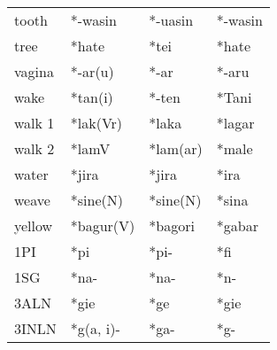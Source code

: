 \begin{table}
\begin{tabular}{llll}
tooth&*-wasin&*-uasin&*-wasin\\
tree&*hate&*tei&*hate\\
vagina&*-ar(u)&*-ar&*-aru\\
wake&*tan(i)&*-ten&*Tani\\
walk 1&*lak(Vr)&*laka&*lagar\\
walk 2&*lamV&*lam(ar)&*male\\
water&*jira&*jira&*ira\\
weave&*sine(N)&*sine(N)&*sina\\
yellow&*bagur(V)&*bagori&*gabar\\
1PI&*pi&*pi-&*fi\\
1SG&*na-&*na-&*n-\\
3ALN&*gie&*ge&*gie\\
3INLN&*g(a, i)-&*ga-&*g-\\
\end{tabular}


\end{table}


